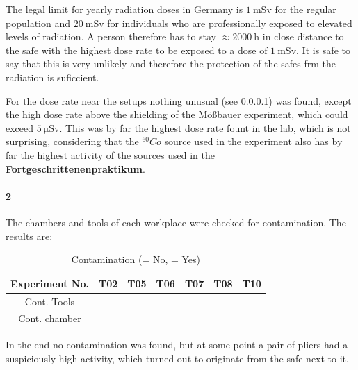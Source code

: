 \documentclass[12pt,twoside,a4paper]{scrartcl}
\newcommand{\xmark}{\ding{55}}%
\begin{document}
			The legal limit for yearly radiation doses in Germany is $\SI{1}{\milli \sievert}$ for the regular population and $\SI{20}{\milli \sievert}$ for individuals who are professionally exposed to elevated levels of radiation. A person therefore has to stay $\approx \SI{2000}{\hour}$ in close distance to the safe with the highest dose rate to be exposed to a dose of $\SI{1}{\milli \sievert}$. It is safe to say that this is very unlikely and therefore the protection of the safes frm the radiation is suficcient.

			For the dose rate near the setups nothing unusual (see \ref{Contamination}) was found, except the high dose rate above the shielding of the Mößbauer experiment, which could exceed $\SI{5}{\micro \sievert}$. This was by far the highest dose rate fount in the lab, which is not surprising, considering that the $^60Co$ source used in the experiment also has by far the highest activity of the sources used in the \textbf{Fortgeschrittenenpraktikum}.

		\paragraph{2}
		\label{Contamination}
			The chambers and tools of each workplace were checked for contamination. The results are:

			\begin{table}[H]
				\centering
				\caption{Contamination (\xmark = No, \checkmark = Yes)}
				\begin{tabular}{|c|c|c|c|c|c|c|}
					\hline
					Experiment No. & T02 & T05 & T06 & T07 & T08 & T10 \\ \hline
					Cont. Tools 	 & \xmark & \xmark & \xmark & \xmark & \xmark & \xmark \\
					Cont. chamber  & \xmark & \xmark & \xmark & \xmark & \xmark & \xmark \\ \hline
				\end{tabular}
			\end{table}

			In the end no contamination was found, but at some point a pair of pliers had a suspiciously high activity, which turned out to originate from the safe next to it.
\end{document}
